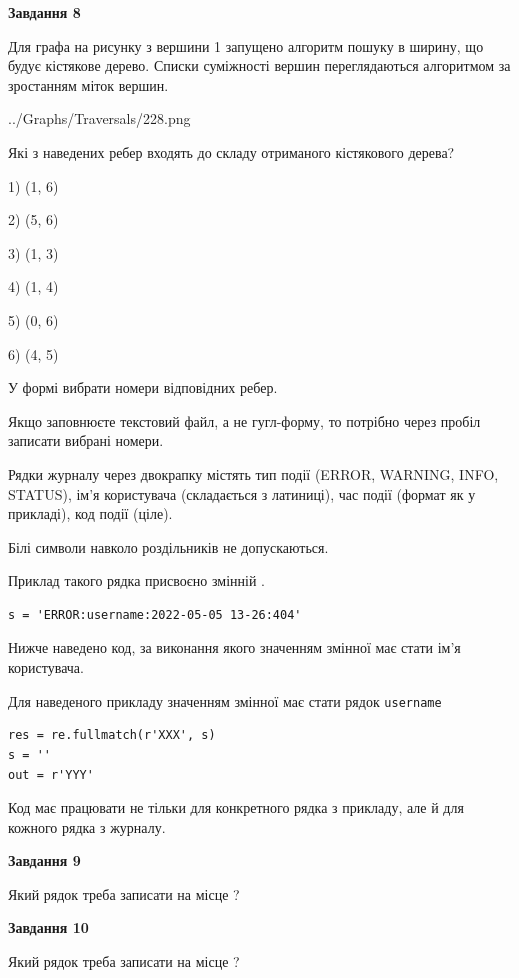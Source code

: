 \documentclass[12pt, ukrainian]{article}
\def\code#1{\Verb!#1!}
\begin{document}
{\begin {large}
{\begin {center}\textbf{Завдання 8}\end {center}}\par
Для графа на рисунку з вершини 1 запущено алгоритм пошуку в ширину, що будує кістякове дерево. Списки суміжності вершин переглядаються алгоритмом за зростанням міток вершин.\par
\begin{center}
	{../Graphs/Traversals/228.png}
\end{center}
\par Які з наведених ребер входять до складу отриманого кістякового дерева?\par
1) (1, 6)\par
2) (5, 6)\par
3) (1, 3)\par
4) (1, 4)\par
5) (0, 6)\par
6) (4, 5)\par
{\vskip 15pt} У формі вибрати номери відповідних ребер.


Якщо заповнюєте текстовий файл, а не гугл-форму, то потрібно через пробіл записа\-ти вибрані номери.\par
\newpage


Рядки журналу через двокрапку містять тип події (ERROR, WARNING, INFO, STATUS), ім'я користувача (складається з латиниці), час події (фор\-мат як у прикладі), код події (ціле).

Білі символи навколо роздільників не допускаються.

Приклад такого рядка присвоєно змінній .



\begin{verbatim}
s = 'ERROR:username:2022-05-05 13-26:404'
\end{verbatim}


Нижче наведено код, за виконання якого значенням змінної  має стати ім'я користувача.

Для наведеного прикладу значенням змінної  має стати рядок \code{username}



\begin{verbatim}
res = re.fullmatch(r'XXX', s)
s = ''
out = r'YYY'
\end{verbatim}


Код має працювати не тільки для конкретного рядка з прикладу, але й для кожного рядка з журналу.

{\begin {center}\textbf{Завдання 9}\end {center}}\par
Який рядок треба записати на місце  ?\par
\vspace{5mm}


{\begin {center}\textbf{Завдання 10}\end {center}}\par
Який рядок треба записати на місце  ?\par


\newpage


\end {large}}
\end{document}
